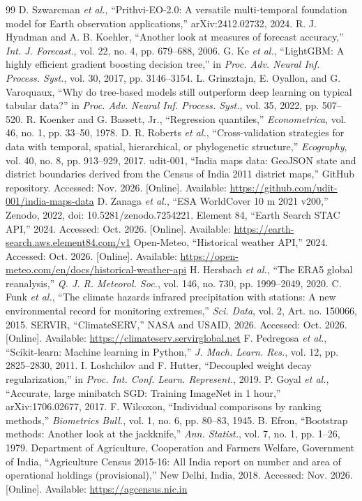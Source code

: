 \documentclass[journal]{IEEEtran}
\begin{document}
\begin{thebibliography}{99}
 D. Szwarcman \emph{et al.}, ``Prithvi-EO-2.0: A versatile multi-temporal foundation model for Earth observation applications,'' arXiv:2412.02732, 2024.
 R. J. Hyndman and A. B. Koehler, ``Another look at measures of forecast accuracy,'' \emph{Int. J. Forecast.}, vol. 22, no. 4, pp. 679--688, 2006.
 G. Ke \emph{et al.}, ``LightGBM: A highly efficient gradient boosting decision tree,'' in \emph{Proc. Adv. Neural Inf. Process. Syst.}, vol. 30, 2017, pp. 3146--3154.
 L. Grinsztajn, E. Oyallon, and G. Varoquaux, ``Why do tree-based models still outperform deep learning on typical tabular data?'' in \emph{Proc. Adv. Neural Inf. Process. Syst.}, vol. 35, 2022, pp. 507--520.
 R. Koenker and G. Bassett, Jr., ``Regression quantiles,'' \emph{Econometrica}, vol. 46, no. 1, pp. 33--50, 1978.
 D. R. Roberts \emph{et al.}, ``Cross-validation strategies for data with temporal, spatial, hierarchical, or phylogenetic structure,'' \emph{Ecography}, vol. 40, no. 8, pp. 913--929, 2017.
 udit-001, ``India maps data: GeoJSON state and district boundaries derived from the Census of India 2011 district maps,'' GitHub repository. Accessed: Nov. 2026. [Online]. Available: \url{https://github.com/udit-001/india-maps-data}
 D. Zanaga \emph{et al.}, ``ESA WorldCover 10 m 2021 v200,'' Zenodo, 2022, doi: 10.5281/zenodo.7254221.
 Element 84, ``Earth Search STAC API,'' 2024. Accessed: Oct. 2026. [Online]. Available: \url{https://earth-search.aws.element84.com/v1}
 Open-Meteo, ``Historical weather API,'' 2024. Accessed: Oct. 2026. [Online]. Available: \url{https://open-meteo.com/en/docs/historical-weather-api}
 H. Hersbach \emph{et al.}, ``The ERA5 global reanalysis,'' \emph{Q. J. R. Meteorol. Soc.}, vol. 146, no. 730, pp. 1999--2049, 2020.
 C. Funk \emph{et al.}, ``The climate hazards infrared precipitation with stations: A new environmental record for monitoring extremes,'' \emph{Sci. Data}, vol. 2, Art. no. 150066, 2015.
 SERVIR, ``ClimateSERV,'' NASA and USAID, 2026. Accessed: Oct. 2026. [Online]. Available: \url{https://climateserv.servirglobal.net}
 F. Pedregosa \emph{et al.}, ``Scikit-learn: Machine learning in Python,'' \emph{J. Mach. Learn. Res.}, vol. 12, pp. 2825--2830, 2011.
 I. Loshchilov and F. Hutter, ``Decoupled weight decay regularization,'' in \emph{Proc. Int. Conf. Learn. Represent.}, 2019.
 P. Goyal \emph{et al.}, ``Accurate, large minibatch SGD: Training ImageNet in 1 hour,'' arXiv:1706.02677, 2017.
 F. Wilcoxon, ``Individual comparisons by ranking methods,'' \emph{Biometrics Bull.}, vol. 1, no. 6, pp. 80--83, 1945.
 B. Efron, ``Bootstrap methods: Another look at the jackknife,'' \emph{Ann. Statist.}, vol. 7, no. 1, pp. 1--26, 1979.
 Department of Agriculture, Cooperation and Farmers Welfare, Government of India, ``Agriculture Census 2015-16: All India report on number and area of operational holdings (provisional),'' New Delhi, India, 2018. Accessed: Nov. 2026. [Online]. Available: \url{https://agcensus.nic.in}
\end{thebibliography}
\end{document}
